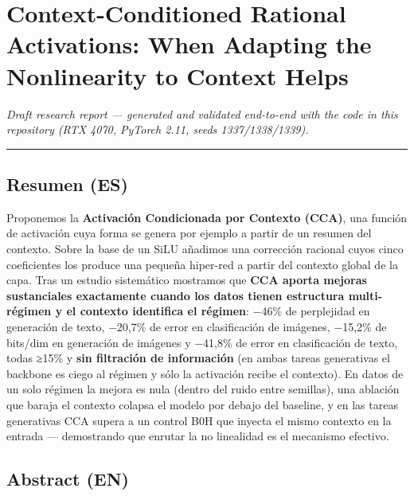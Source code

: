 \documentclass[
  11pt,
]{article}
\author{}
\date{}
\begin{document}
{
\setcounter{tocdepth}{3}
\tableofcontents
}
\section{Context-Conditioned Rational Activations: When Adapting the
Nonlinearity to Context
Helps}\label{context-conditioned-rational-activations-when-adapting-the-nonlinearity-to-context-helps}

\emph{Draft research report --- generated and validated end-to-end with
the code in this repository (RTX 4070, PyTorch 2.11, seeds
1337/1338/1339).}

\begin{center}\rule{0.5\linewidth}{0.5pt}\end{center}

\subsection{Resumen (ES)}\label{resumen-es}

Proponemos la \textbf{Activación Condicionada por Contexto (CCA)}, una
función de activación cuya forma se genera por ejemplo a partir de un
resumen del contexto. Sobre la base de un SiLU añadimos una corrección
racional cuyos cinco coeficientes los produce una pequeña hiper-red a
partir del contexto global de la capa. Tras un estudio sistemático
mostramos que \textbf{CCA aporta mejoras sustanciales exactamente cuando
los datos tienen estructura multi-régimen y el contexto identifica el
régimen}: −46\% de perplejidad en generación de texto, −20,7\% de error
en clasificación de imágenes, −15,2\% de bits/dim en generación de
imágenes y −41,8\% de error en clasificación de texto, todas ≥15\% y
\textbf{sin filtración de información} (en ambas tareas generativas el
backbone es ciego al régimen y sólo la activación recibe el contexto).
En datos de un solo régimen la mejora es nula (dentro del ruido entre
semillas), una ablación que baraja el contexto colapsa el modelo por
debajo del baseline, y en las tareas generativas CCA supera a un control
B0H que inyecta el mismo contexto en la entrada --- demostrando que
enrutar la no linealidad es el mecanismo efectivo.

\subsection{Abstract (EN)}\label{abstract-en}
\end{document}
